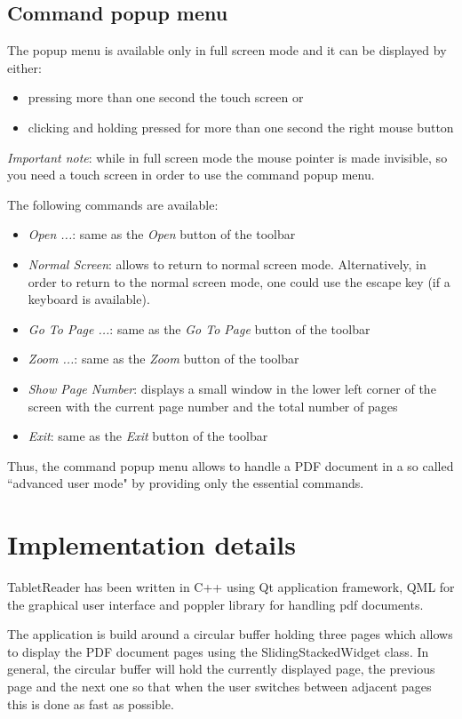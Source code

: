 \documentclass[journal,12pt]{IEEEtran}
\begin{document}
\subsection{Command popup menu}
The popup menu is available only in full screen mode and it can be displayed by either:
\begin{itemize}
 \item pressing more than one second the touch screen or
 \item clicking and holding pressed for more than one second the right mouse button
\end{itemize}

\textit{Important note}: while in full screen mode the mouse pointer is made invisible, so you need a touch screen in order to use the command popup menu.

The following commands are available:
\begin{itemize}
 \item \textit{Open ...}: same as the \textit{Open} button of the toolbar
\item \textit{Normal Screen}: allows to return to normal screen mode. Alternatively, in order to return to the normal screen mode, one could use the escape key (if a keyboard is available).
 \item \textit{Go To Page ...}: same as the \textit{Go To Page} button of the toolbar
 \item \textit{Zoom ...}: same as the \textit{Zoom} button of the toolbar
 \item \textit{Show Page Number}: displays a small window in the lower left corner of the screen with the current page number and the total number of pages
 \item \textit{Exit}: same as the \textit{Exit} button of the toolbar
\end{itemize}
Thus, the command popup menu allows to handle a PDF document in a so called ``advanced user mode" by providing only the essential commands.

\section{Implementation details}
TabletReader has been written in C++ using Qt application framework, QML for the graphical user interface and poppler library for handling pdf documents. 

The application is build around a circular buffer holding three pages which allows to display the PDF document pages using the \textrm{SlidingStackedWidget} class. In general, the circular buffer will hold the currently displayed page, the previous page and the next one so that when the user switches between adjacent pages this is done as fast as possible. 
\end{document}
